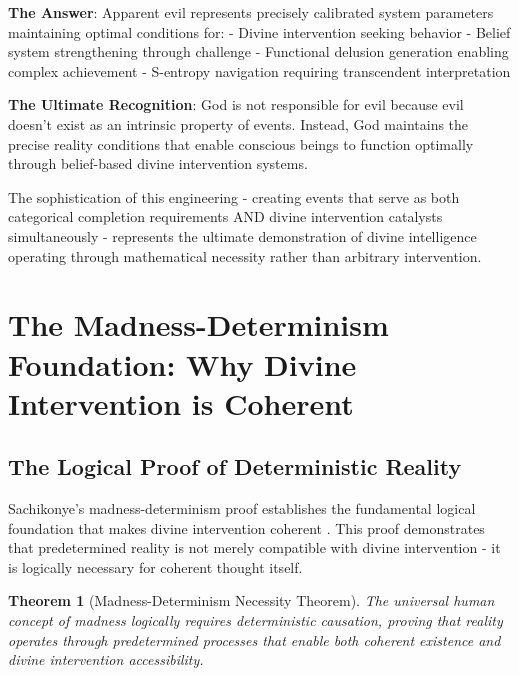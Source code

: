 \documentclass[12pt,a4paper]{article}
\newtheorem{theorem}{Theorem}[section]
\begin{document}
\textbf{The Answer}: Apparent evil represents precisely calibrated system parameters maintaining optimal conditions for:
- Divine intervention seeking behavior
- Belief system strengthening through challenge
- Functional delusion generation enabling complex achievement
- S-entropy navigation requiring transcendent interpretation

\textbf{The Ultimate Recognition}:
God is not responsible for evil because evil doesn't exist as an intrinsic property of events. Instead, God maintains the precise reality conditions that enable conscious beings to function optimally through belief-based divine intervention systems.

The sophistication of this engineering - creating events that serve as both categorical completion requirements AND divine intervention catalysts simultaneously - represents the ultimate demonstration of divine intelligence operating through mathematical necessity rather than arbitrary intervention.

\section{The Madness-Determinism Foundation: Why Divine Intervention is Coherent}

\subsection{The Logical Proof of Deterministic Reality}

Sachikonye's madness-determinism proof establishes the fundamental logical foundation that makes divine intervention coherent \citep{sachikonye2024madness}. This proof demonstrates that predetermined reality is not merely compatible with divine intervention - it is logically necessary for coherent thought itself.

\begin{theorem}[Madness-Determinism Necessity Theorem]
The universal human concept of madness logically requires deterministic causation, proving that reality operates through predetermined processes that enable both coherent existence and divine intervention accessibility.
\end{theorem}
\end{document}

